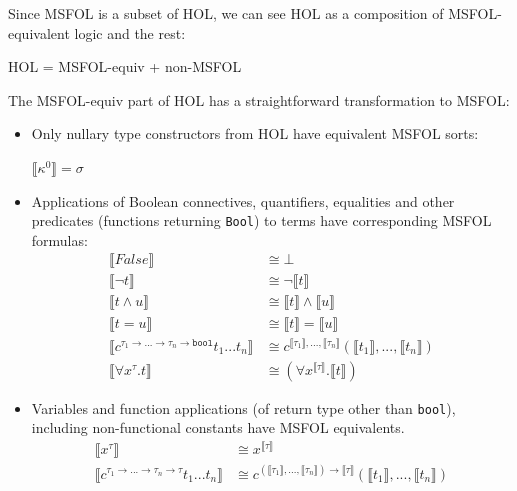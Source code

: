 \documentclass{article}
\begin{document}
	Since MSFOL is a subset of 
	HOL, we can see HOL as a 
	composition of 
	MSFOL-equivalent logic 
	and the rest:
	\begin{center}
		HOL = MSFOL-equiv + non-MSFOL 
	\end{center}
	The MSFOL-equiv part of HOL has 
	a straightforward transformation 
	to MSFOL:
	\begin{itemize}
	\item Only nullary type 
		constructors from HOL have
		equivalent MSFOL sorts:
		\begin{center}
			$\llbracket \kappa^{0} 
			\rrbracket = \sigma $
		\end{center}
	\item Applications of 
		Boolean connectives,
		quantifiers, equalities and 
		other predicates (functions 
		returning \texttt{Bool}) to 
		terms have corresponding 
		MSFOL formulas:
		\begin{align*}
			\llbracket False 
			\rrbracket &\cong \bot \\
			\llbracket \neg t \rrbracket 
			&\cong \neg \llbracket t 
			\rrbracket\\
			\llbracket t \land u 
			\rrbracket &\cong \llbracket t 
			\rrbracket \land \llbracket u
			\rrbracket\\
			\llbracket t = u \rrbracket 
			&\cong \llbracket t 
			\rrbracket = \llbracket u
			\rrbracket\\
			\llbracket c^{\tau_1 \to ... 
			\to \tau_n \to \texttt{bool}} 
			t_1 ... t_n \rrbracket &\cong 
			c^{\llbracket \tau_1 \rrbracket, 
			..., \llbracket \tau_n \rrbracket}
			(\llbracket t_1 \rrbracket, ..., 
			\llbracket t_n \rrbracket)\\
			\llbracket \forall x^{\tau}.t 
			\rrbracket &\cong (\forall 
			x^{\llbracket \tau \rrbracket}.
			\llbracket t \rrbracket)
		\end{align*}
	\item Variables and function 
		applications (of return type 
		other than \texttt{bool}), 
		including non-functional 
		constants have MSFOL 
		equivalents.
		\begin{align*}
			\llbracket x^{\tau} 
			\rrbracket &\cong 
			x^{\llbracket \tau \rrbracket}\\
			\llbracket c^{\tau_1 \to ... 
			\to \tau_n \to \tau} 
			t_1 ... t_n \rrbracket &\cong 
			c^{(\llbracket \tau_1 \rrbracket, 
			..., \llbracket \tau_n \rrbracket)
			\to \llbracket \tau \rrbracket}
			(\llbracket t_1 \rrbracket, ..., 
			\llbracket t_n \rrbracket)
		\end{align*}
	\end{itemize}
\end{document}
